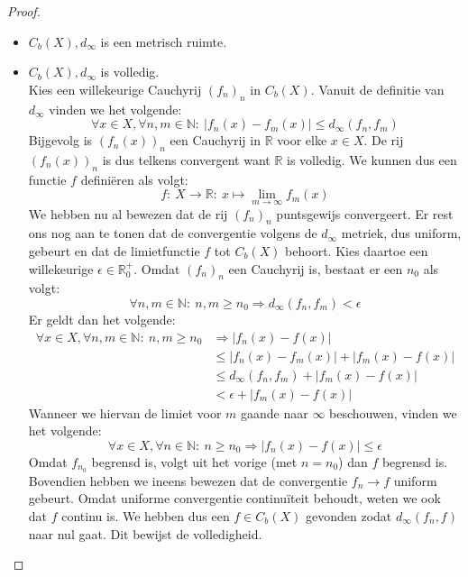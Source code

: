 \documentclass[main.tex]{subfiles}
\begin{document}
\begin{bpr}
  \begin{proof}
    \noindent
    \begin{itemize}
    \item $C_{b}(X),d_{\infty}$ is een metrisch ruimte.
    \item $C_{b}(X),d_{\infty}$ is volledig.\\
      Kies een willekeurige Cauchyrij $(f_{n})_{n}$ in $C_{b}(X)$.
      Vanuit de definitie van $d_{\infty}$ vinden we het volgende:
      \[ \forall x\in X, \forall n,m\in \mathbb{N}:\ \left| f_{n}(x) -f_{m}(x) \right| \le d_{\infty} \left(f_{n},f_{m}\right) \]
      Bijgevolg is $(f_{n}(x))_{n}$ een Cauchyrij in $\mathbb{R}$ voor elke $x\in X$.
      De rij $(f_{n}(x))_{n}$ is dus telkens convergent want $\mathbb{R}$ is volledig.
      We kunnen dus een functie $f$ defini\"eren als volgt:
      \[ f:\ X \rightarrow \mathbb{R}:\ x \mapsto \lim_{m\rightarrow\infty}f_{m}(x) \]
      We hebben nu al bewezen dat de rij $(f_{n})_{n}$ puntsgewijs convergeert.
      Er rest ons nog aan te tonen dat de convergentie volgens de $d_{\infty}$ metriek, dus uniform, gebeurt en dat de limietfunctie $f$ tot $C_{b}(X)$ behoort.
      Kies daartoe een willekeurige $\epsilon\in \mathbb{R}_{0}^{+}$.
      Omdat $(f_{n})_{n}$ een Cauchyrij is, bestaat er een $n_{0}$ als volgt:
      \[ \forall n,m\in\mathbb{N}:\ n,m \ge n_{0} \Rightarrow d_{\infty}(f_{n},f_{m}) < \epsilon \]
      Er geldt dan het volgende:
      \begin{align*}
        \forall x\in X, \forall n,m\in\mathbb{N}:\ n,m \ge n_{0} &\Rightarrow \left|f_{n}(x) -f(x) \right|\\
        &\le \left|f_{n}(x)-f_{m}(x) \right| + \left|f_{m}(x) -f(x)\right|\\
        &\le d_{\infty}(f_{n},f_{m}) + \left|f_{m}(x) - f(x)\right|\\
        &<\epsilon + \left|f_{m}(x) -f(x) \right|
      \end{align*}
      Wanneer we hiervan de limiet voor $m$ gaande naar $\infty$ beschouwen, vinden we het volgende:
      \[ \forall x\in X, \forall n\in\mathbb{N}:\ n \ge n_{0} \Rightarrow \left|f_{n}(x) -f(x)\right| \le \epsilon \]
      Omdat $f_{n_{0}}$ begrensd is, volgt uit het vorige (met $n=n_{0}$) dan $f$ begrensd is.
      Bovendien hebben we ineens bewezen dat de convergentie $f_{n}\rightarrow f$ uniform gebeurt.
      Omdat uniforme convergentie continu\"iteit behoudt\needed, weten we ook dat $f$ continu is.
      We hebben dus een $f\in C_{b}(X)$ gevonden zodat $d_{\infty}(f_{n},f)$ naar nul gaat.
      Dit bewijst de volledigheid.
    \end{itemize}
  \end{proof}
\end{bpr}
\end{document}
